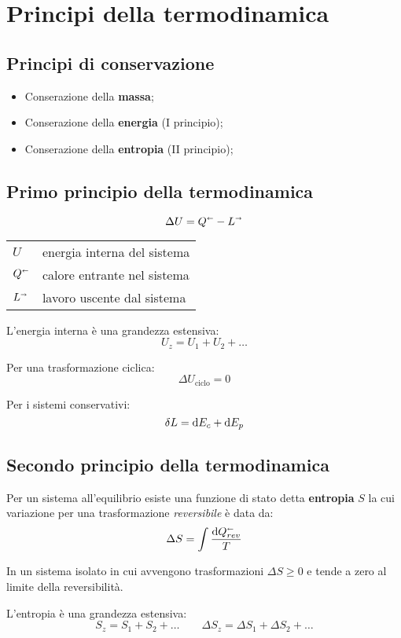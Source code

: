\section{Principi della termodinamica}

\subsection{Principi di conservazione}
\begin{itemize}
    \item Conserazione della \textbf{massa};
    \item Conserazione della \textbf{energia} (I principio);
    \item Conserazione della \textbf{entropia} (II principio);
\end{itemize}

\subsection{Primo principio della termodinamica}

\[\Delta U = Q^\shortleftarrow - L^\shortrightarrow \]

\begin{tabular}{ll}
    $U$ & energia interna del sistema \\
    $Q^\shortleftarrow$ & calore entrante nel sistema \\
    $L^\shortrightarrow$ & lavoro uscente dal sistema \\
\end{tabular}

L'energia interna è una grandezza estensiva:
\[U_z = U_1 + U_2 + \ldots\]

Per una trasformazione ciclica:
\[\Delta U_{\text{ciclo}} = 0 \]

Per i sistemi conservativi:
\[\var{L} = \dd{E_c} + \dd{E_p}\]


\subsection{Secondo principio della termodinamica}

Per un sistema all'equilibrio esiste una funzione di stato detta \textbf{entropia} $S$ la cui variazione per una trasformazione \emph{reversibile} è data da:
\[\Delta S = \int \frac{\dd{Q_{rev}^\shortleftarrow}}{T}\]

In un sistema isolato in cui avvengono trasformazioni $\Delta S \ge 0$ e tende a zero al limite della reversibilità.

L'entropia è una grandezza estensiva:
\[
    S_z = S_1 + S_2 + \ldots \qquad \Delta S_z = \Delta S_1 + \Delta S_2 + \ldots
\]

